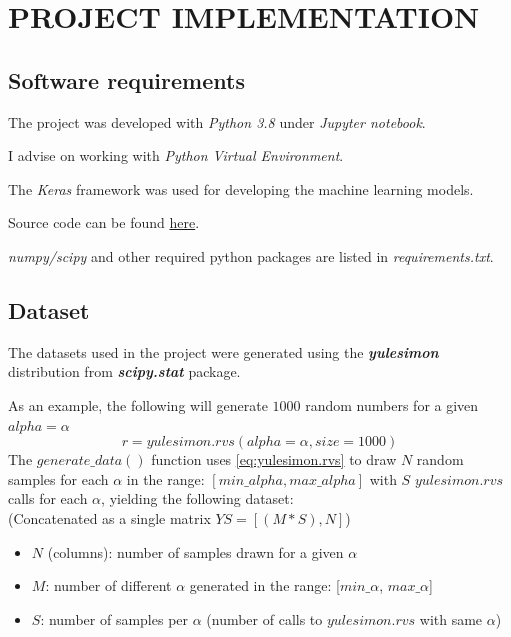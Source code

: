 \documentclass[a4paper, 12pt]{report}
\begin{document}
\chapter{PROJECT IMPLEMENTATION}

\section{Software requirements}
The project was developed with \textit{Python 3.8} under \textit{Jupyter notebook}.

I advise on working with \textit{Python Virtual Environment}.

The \textit{Keras} framework was used for developing the machine learning models.

Source code can be found \href{https://github.com/yossi-cohen/preferential-attachment}{here}.

\textit{numpy/scipy} and other required python packages are listed in \textit{requirements.txt}.

\section{Dataset}
\label{dataset}

\par The datasets used in the project were generated using the \textbf{\textit{yulesimon}} distribution from \textbf{\textit{scipy.stat}} package.

\par As an example, the following will generate $1000$ random numbers for a given $alpha=\alpha$
\begin{equation}
\label{eq:yulesimon.rvs}
r = yulesimon.rvs(alpha=\alpha, size=1000)
\end{equation}
The $generate\_data()$ function uses \ref{eq:yulesimon.rvs} to draw $N$ random samples for each $\alpha$ in the range: $[min\_alpha, max\_alpha]$ with $S$ $yulesimon.rvs$ calls for each $\alpha$, yielding the following dataset:\\
(Concatenated as a single matrix $YS = [(M * S), N]$)
\begin{itemize}
  \item $N$ (columns): number of samples drawn for a given $\alpha$
  \item $M$: number of different $\alpha$ generated in the range: [$min\_\alpha$, $max\_\alpha$]
  \item $S$: number of samples per $\alpha$ (number of calls to $yulesimon.rvs$ with same $\alpha$)
\end{itemize}
\end{document}
